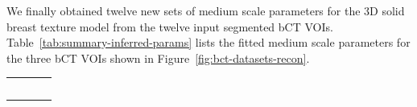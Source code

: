 \documentclass[journal]{IEEEtran}
\begin{document}
We finally obtained twelve new sets of medium scale parameters for the
3D solid breast texture model from the twelve input segmented bCT
VOIs. Table~\ref{tab:summary-inferred-params} lists the fitted medium
scale parameters for the three bCT VOIs shown in
Figure~\ref{fig:bct-datasets-recon}.

\begin{table}[!htb]
  {\fontsize{9}{8}\selectfont
    \begin{center}
      \begin{tabular}{ m{1.6cm} m{1.8cm} m{1.8cm} m{1.8cm} }

        \toprule

        \centering{\textbf{VOI}}
        & \centering{\#3}
        & \centering{\#7}
        & \centering{\#11}
          \tabularnewline%

        \cmidrule(lr){1-1} \cmidrule(lr){2-2}
        \cmidrule(lr){3-3} \cmidrule(lr){4-4}

        \centering{$\kappa$ (\si{\per\mm\cubed})}
        & \centering{$3.24e-03$}
        & \centering{$3.41e-03$}
        & \centering{$2.87e-04$}
          \tabularnewline%

        \cmidrule(lr){1-1} \cmidrule(lr){2-2}
        \cmidrule(lr){3-3} \cmidrule(lr){4-4}

        \centering{$\lambda_0$ (\si{\per\mm\cubed})}
        & \centering{$5.98e-03$}
        & \centering{$1.92e-02$}
        & \centering{$3.09e-02$}
          \tabularnewline%

        \cmidrule(lr){1-1} \cmidrule(lr){2-2}
        \cmidrule(lr){3-3} \cmidrule(lr){4-4}

        \centering{$R$ (\si{\mm})}
        & \centering{$5.98$}
        & \centering{$3.85$}
        & \centering{$5.82$}
          \tabularnewline%

        \cmidrule(lr){1-1} \cmidrule(lr){2-2}
        \cmidrule(lr){3-3} \cmidrule(lr){4-4}

        \centering{$p_{L_a}$ (\si{\mm})}
        & \centering{$\mathcal{N}(6.21, 1.41)$}
        & \centering{$\mathcal{N}(5.88, 1.44)$}
        & \centering{$\mathcal{N}(6.06, 1.39)$}
          \tabularnewline%

        \cmidrule(lr){1-1} \cmidrule(lr){2-2}
        \cmidrule(lr){3-3} \cmidrule(lr){4-4}


\end{tabular}
\end{center}}
\end{table}
\end{document}
